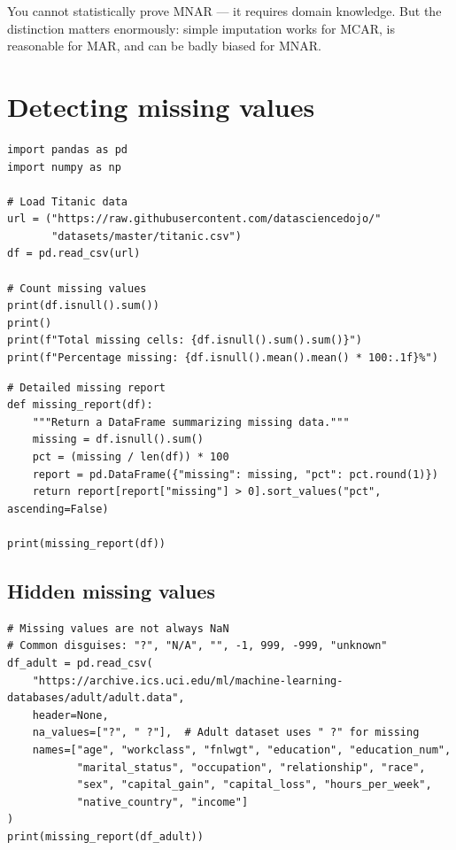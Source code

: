 \begin{warningbox}
You cannot statistically prove MNAR --- it requires domain knowledge. But the distinction matters enormously: simple imputation works for MCAR, is reasonable for MAR, and can be badly biased for MNAR.
\end{warningbox}

\section{Detecting missing values}

\begin{verbatim}
import pandas as pd
import numpy as np

# Load Titanic data
url = ("https://raw.githubusercontent.com/datasciencedojo/"
       "datasets/master/titanic.csv")
df = pd.read_csv(url)

# Count missing values
print(df.isnull().sum())
print()
print(f"Total missing cells: {df.isnull().sum().sum()}")
print(f"Percentage missing: {df.isnull().mean().mean() * 100:.1f}%")
\end{verbatim}

\begin{verbatim}
# Detailed missing report
def missing_report(df):
    """Return a DataFrame summarizing missing data."""
    missing = df.isnull().sum()
    pct = (missing / len(df)) * 100
    report = pd.DataFrame({"missing": missing, "pct": pct.round(1)})
    return report[report["missing"] > 0].sort_values("pct", ascending=False)

print(missing_report(df))
\end{verbatim}

\subsection{Hidden missing values}

\begin{verbatim}
# Missing values are not always NaN
# Common disguises: "?", "N/A", "", -1, 999, -999, "unknown"
df_adult = pd.read_csv(
    "https://archive.ics.uci.edu/ml/machine-learning-databases/adult/adult.data",
    header=None,
    na_values=["?", " ?"],  # Adult dataset uses " ?" for missing
    names=["age", "workclass", "fnlwgt", "education", "education_num",
           "marital_status", "occupation", "relationship", "race",
           "sex", "capital_gain", "capital_loss", "hours_per_week",
           "native_country", "income"]
)
print(missing_report(df_adult))
\end{verbatim}

